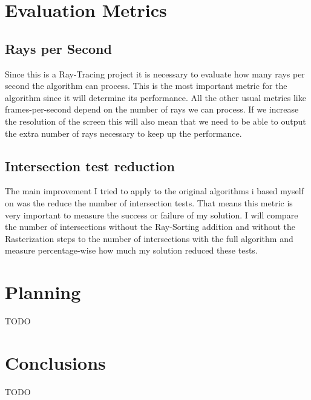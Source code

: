 \documentclass{llncs}
\begin{document}
\newpage

%
\section{Evaluation Metrics}
%

%
\subsection{Rays per Second}
%

Since this is a Ray-Tracing project it is necessary to evaluate how many rays per second the algorithm can process. This is the most important metric for the algorithm since it will determine its performance. All the other usual metrics like frames-per-second depend on the number of rays we can process. If we increase the resolution of the screen this will also mean that we need to be able to output the extra number of rays necessary to keep up the performance.

%
\subsection{Intersection test reduction}
%

The main improvement I tried to apply to the original algorithms i based myself on was the reduce the number of intersection tests. That means this metric is very important to measure the success or failure of my solution. I will compare the number of intersections without the Ray-Sorting addition and without the Rasterization steps to the number of intersections with the full algorithm and measure percentage-wise how much my solution reduced these tests.

\newpage

%
\section{Planning}
%

TODO

\newpage

%
\section{Conclusions}
%

TODO

\newpage

%
%



\end{document}
